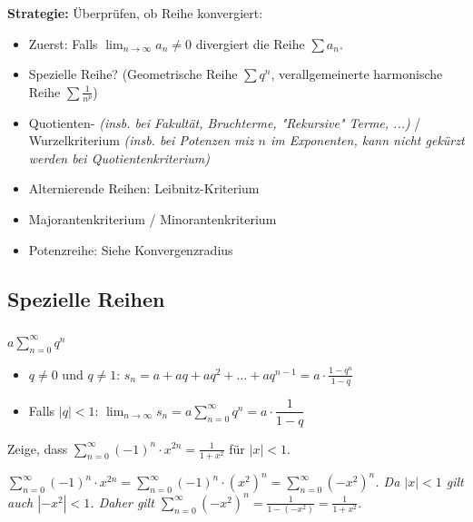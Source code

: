 \begin{exercise}
    \textbf{Strategie:} Überprüfen, ob Reihe konvergiert:
    \begin{itemize}
        \item Zuerst: Falls $\lim_{n\rightarrow \infty} a_n \neq 0$ divergiert die Reihe $\sum a_n$.
        \item Spezielle Reihe? (Geometrische Reihe $\sum q^n$, verallgemeinerte harmonische Reihe $\sum \frac{1}{n^p}$)
        \item Quotienten- \textit{(insb. bei Fakultät, Bruchterme, "Rekursive" Terme, ...)} / Wurzelkriterium \textit{(insb. bei Potenzen miz $n$ im Exponenten, kann nicht gekürzt werden bei Quotientenkriterium)}
        \item Alternierende Reihen: Leibnitz-Kriterium
        \item Majorantenkriterium / Minorantenkriterium
        \item Potenzreihe: Siehe Konvergenzradius
    \end{itemize}
\end{exercise}


\subsection{Spezielle Reihen}

\subsubsection{}
$a \sum_{n=0}^{\infty} q^n$
\begin{itemize}
    \item {\color{gray}$q \neq 0$ und} $q \neq 1$: $s_n = a + aq + aq^2+...+aq^{n-1} = a \cdot \frac{1-q^n}{1-q}$
    \item Falls $|q|<1$: $\lim_{n \rightarrow \infty} s_n = a \sum_{n=0}^{\infty} q^n = a \cdot \dfrac{1}{1-q}$
\end{itemize}

\begin{exercise}
    Zeige, dass $\sum_{n=0}^{\infty} (-1)^n \cdot x^{2n} = \frac{1}{1 + x^2}$ für $|x|<1$.

    \textit{$\sum_{n=0}^{\infty} (-1)^n \cdot x^{2n} = \sum_{n=0}^{\infty} (-1)^n \cdot (x^2)^n = \sum_{n=0}^{\infty} (-x^2)^n$. Da $|x|<1$ gilt auch $|-x^2|<1$. Daher gilt $\sum_{n=0}^{\infty} (-x^2)^n = \frac{1}{1-(-x^2)} = \frac{1}{1 + x^2}$.}
\end{exercise}

